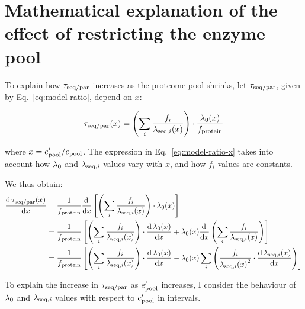\section{Mathematical explanation of the effect of restricting the enzyme pool}
\label{append:model-pool}

To explain how $\tau_{\mathrm{seq}/\mathrm{par}}$ increases as the proteome pool shrinks, let $\tau_{\mathrm{seq}/\mathrm{par}}$, given by Eq.\ \ref{eq:model-ratio}, depend on $x$:

\begin{equation}
  \tau_{\mathrm{seq}/\mathrm{par}}(x) = \left( \sum_i \frac{f_i}{\lambda_{\mathrm{seq},i}(x)} \right) \cdot \frac{\lambda_{0}(x)}{f_{\mathrm{protein}}}
  \label{eq:model-ratio-x}
\end{equation}

where $x = e_{\mathrm{pool}}^{\prime}/e_{\mathrm{pool}}$.
The expression in Eq.\ \ref{eq:model-ratio-x} takes into account how $\lambda_{0}$ and $\lambda_{\mathrm{seq},i}$ values vary with $x$, and how $f_{i}$ values are constants.

We thus obtain:
\begin{equation}
  \begin{aligned}
  \frac{\mathrm{d} \, \tau_{\mathrm{seq}/\mathrm{par}}(x)}{\mathrm{d} x} &= \frac{1}{f_{\mathrm{protein}}} \frac{\mathrm{d} \, }{\mathrm{d} x} \left[ \left( \sum_i \frac{f_i}{\lambda_{\mathrm{seq},i}(x)} \right) \cdot \lambda_{0}(x) \right]\\
  &= \frac{1}{f_{\mathrm{protein}}} \left[ \left( \sum_i \frac{f_i}{\lambda_{\mathrm{seq},i}(x)} \right) \cdot \frac{\mathrm{d} \, \lambda_{0}(x)}{\mathrm{d} x} + \lambda_{0}(x) \frac{\mathrm{d} \, }{\mathrm{d} x} \left( \sum_i \frac{f_i}{\lambda_{\mathrm{seq},i}(x)} \right) \right]\\
  &= \frac{1}{f_{\mathrm{protein}}} \left[ \left( \sum_i \frac{f_i}{\lambda_{\mathrm{seq},i}(x)} \right) \cdot \frac{\mathrm{d} \, \lambda_{0}(x)}{\mathrm{d} x} - \lambda_{0}(x) \sum_{i}\left( \frac{f_{i}}{{\lambda_{\mathrm{seq},i}(x)}^{2}} \cdot \frac{\mathrm{d} \, \lambda_{\mathrm{seq},i}(x)}{\mathrm{d} x} \right) \right]
  \end{aligned}
  \label{eq:model-ratio-diff}
\end{equation}

To explain the increase in $\tau_{\mathrm{seq}/\mathrm{par}}$ as $e_{\mathrm{pool}}^{\prime}$ increases, I consider the behaviour of $\lambda_{0}$ and $\lambda_{\mathrm{seq},i}$ values with respect to $e_{\mathrm{pool}}^{\prime}$ in intervals.

